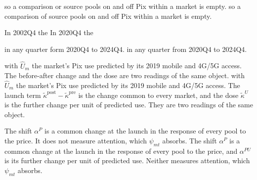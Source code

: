 so a comparison or source pools on and off Pix within a market is empty.
so a comparison of source pools on and off Pix within a market is empty.

In 2002Q4 the 
In 2020Q4 the 

in any quarter form 2020Q4 to 2024Q4.
in any quarter from 2020Q4 to 2024Q4.

with $\hat{U}_m$ the market's Pix use predicted by its 2019 mobile and 4G/5G access. The before-after change and the dose are two readings of the same object.
with $\hat{U}_m$ the market's Pix use predicted by its 2019 mobile and 4G/5G access. The launch term $\tilde{\kappa}^{\mathrm{post}}-\tilde{\kappa}^{\mathrm{pre}}$ is the change common to every market, and the dose $\tilde{\kappa}^{U}$ is the further change per unit of predicted use. They are two readings of the same object.

The shift $\alpha^{P}$ is a common change at the launch in the response of every pool to the price. It does not measure attention, which $\psi_{mt}$ absorbs.
The shift $\alpha^{P}$ is a common change at the launch in the response of every pool to the price, and $\alpha^{PU}$ is its further change per unit of predicted use. Neither measures attention, which $\psi_{mt}$ absorbs.

